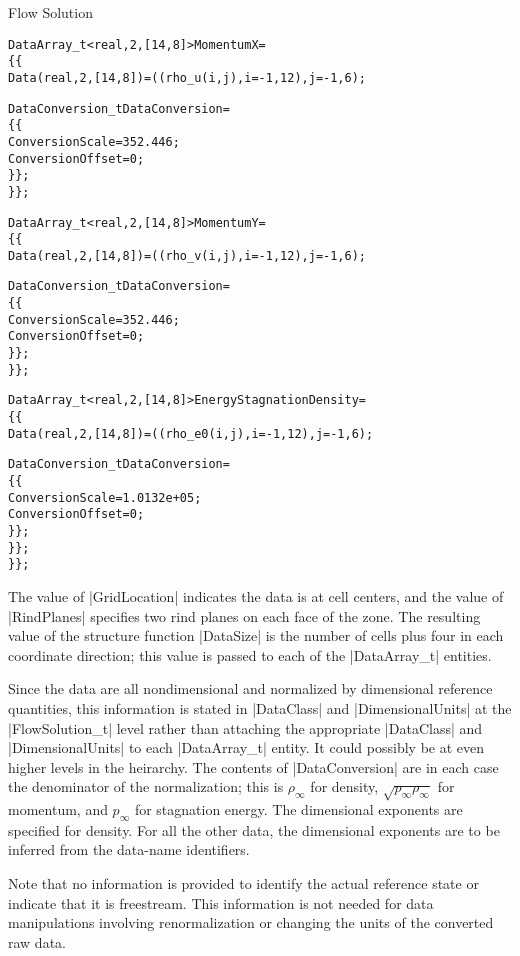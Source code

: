\begin{example}{Flow Solution}
\begin{alltt}
    DataArray\_t<real, 2, [14,8]> MomentumX =
      \{\{
      Data(real, 2, [14,8]) = ((rho\_u(i,j), i=-1,12), j=-1,6) ;

      DataConversion\_t DataConversion =
        \{\{
        ConversionScale  = 352.446 ;
        ConversionOffset = 0 ;
        \}\} ;
      \}\} ;

    DataArray\_t<real, 2, [14,8]> MomentumY =
      \{\{
      Data(real, 2, [14,8]) = ((rho\_v(i,j), i=-1,12), j=-1,6) ;

      DataConversion\_t DataConversion =
        \{\{
        ConversionScale  = 352.446 ;
        ConversionOffset = 0 ;
        \}\} ;
      \}\} ;

    DataArray\_t<real, 2, [14,8]> EnergyStagnationDensity =
      \{\{
      Data(real, 2, [14,8]) = ((rho\_e0(i,j), i=-1,12), j=-1,6) ;

      DataConversion\_t DataConversion =
        \{\{
        ConversionScale  = 1.0132e+05 ;
        ConversionOffset = 0 ;
        \}\} ;
      \}\} ;
    \}\} ;
\end{alltt}
The value of |GridLocation| indicates the data is at cell centers, and the
value of |RindPlanes| specifies two rind planes on each face of the zone.
The resulting value of the structure function |DataSize| is the number of
cells plus four in each coordinate direction; this value is passed to each
of the |DataArray_t| entities.

Since the data are all nondimensional and normalized by dimensional
reference quantities, this information is stated in |DataClass| and 
|DimensionalUnits| at the |FlowSolution_t| level rather than attaching
the appropriate |DataClass| and |DimensionalUnits| to each |DataArray_t|
entity.
It could possibly be at even higher levels in the heirarchy.
The contents of |DataConversion| are in each case the denominator of the
normalization; this is $\rho_\infty$ for density,
$\sqrt{p_\infty \rho_\infty}$ for momentum, and $p_\infty$ for
stagnation energy.
The dimensional exponents are specified for density.
For all the other data, the dimensional exponents are to be inferred from
the data-name identifiers.

Note that no information is provided to identify the actual reference
state or indicate that it is freestream.  This information is not needed
for data manipulations involving renormalization or changing the units
of the converted raw data.
\end{example}


